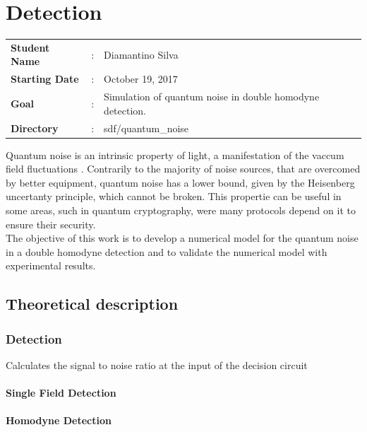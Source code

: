 \clearpage
\section{Detection}


\begin{tcolorbox}	
\begin{tabular}{p{2.75cm} p{0.2cm} p{10.5cm}}
\textbf{Student Name}  &:& Diamantino Silva\\
\textbf{Starting Date} &:& October 19, 2017\\
\textbf{Goal}          &:& Simulation of quantum noise in double homodyne detection.\\
\textbf{Directory}     &:& sdf/quantum\_noise
\end{tabular}
\end{tcolorbox}
%
\vspace{2em}
%
Quantum noise is an intrinsic property of light, a manifestation of the vaccum field fluctuations
\cite{fox2006}.
Contrarily to the majority of noise sources, that are overcomed by better equipment, quantum noise has a lower bound, given by the Heisenberg uncertanty principle, which cannot be broken. This propertie can be useful in some areas, such in quantum cryptography, were many protocols depend on it to ensure their security.\\
The objective of this work is to develop a numerical model for the quantum noise in a double homodyne detection and to validate the numerical model with experimental results.\\


\subsection{Theoretical description}\label{sec:intro}

\subsubsection{Detection}

Calculates the signal to noise ratio at the input of the decision circuit

\paragraph{Single Field Detection}

\paragraph{Homodyne Detection}

